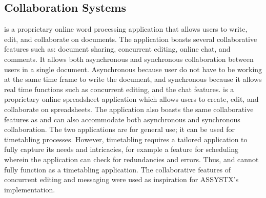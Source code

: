 \subsection{Collaboration Systems}

\citep{googleDocs} is a proprietary online word processing application that allows users to write, edit, and collaborate on documents. The application boasts several collaborative features such as: document sharing, concurrent editing, online chat, and comments. It allows both asynchronous and synchronous collaboration between users in a single document. Asynchronous because user do not have to be working at the same time frame to write the document, and synchronous because it allows real time functions such as concurrent editing, and the chat features. \cite{googleSheets} is a proprietary online spreadsheet application which allows users to create, edit, and collaborate on spreadsheets. The application also boasts the same collaborative features as \cite{googleDocs} and can also accommodate both asynchronous and synchronous collaboration. The two applications are for general use; it can be used for timetabling processes. However, timetabling requires a tailored application to fully capture its needs and intricacies, for example a feature for scheduling wherein the application can check for redundancies and errors. Thus, \cite{googleDocs} and \cite{googleSheets} cannot fully function as a timetabling application. The collaborative features of concurrent editing and messaging were used as inspiration for ASSYSTX's implementation. 


